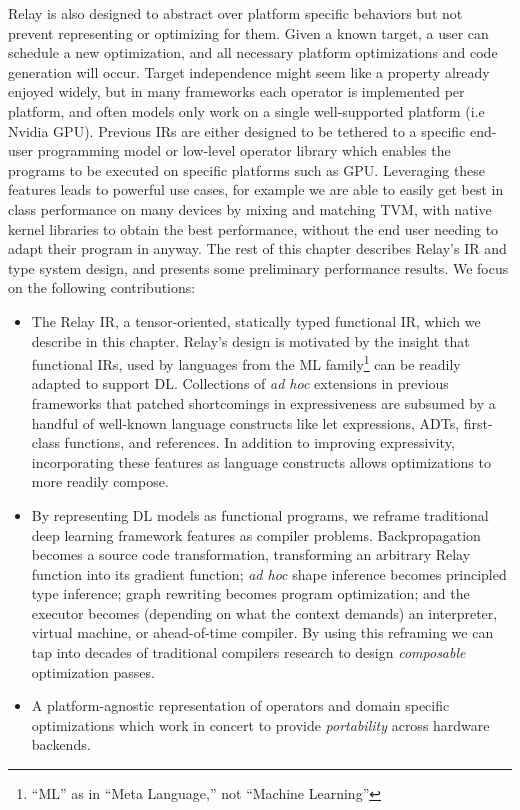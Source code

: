 Relay is also designed to abstract over platform specific behaviors but not prevent
  representing or optimizing for them.
Given a known target, a user can schedule a new optimization,
  and all necessary platform optimizations and code generation will occur.
Target independence might seem like a property already enjoyed widely,
  but in many frameworks each operator is implemented per platform,
  and often models only work on a single well-supported platform (i.e Nvidia GPU).
Previous IRs are either designed to be tethered to a specific end-user programming model
    or low-level operator library which enables the programs to be executed on specific platforms such as GPU.
Leveraging these features leads to powerful use cases,
  for example we are able to easily get best in class performance on many devices by mixing and matching TVM,
  with native kernel libraries to obtain the best performance, without the end user needing to adapt their program
  in anyway.
The rest of this chapter describes Relay’s IR and type system design, and presents some preliminary
  performance results.
We focus on the following contributions:
\begin{itemize}
  \item The Relay IR, a tensor-oriented, statically typed
    functional IR,
    which we describe in this chapter.
  Relay's design is motivated by the insight that functional IRs, used by
  languages from the ML family\footnote{``ML'' as in ``Meta Language,'' not
  ``Machine Learning''} can be readily adapted to support DL.
  Collections of \textit{ad hoc} extensions in previous frameworks
    that patched shortcomings in expressiveness are subsumed by a handful of well-known language
    constructs like let expressions, ADTs, first-class functions, and references.
  In addition to improving expressivity,
    incorporating these features as language constructs
    allows optimizations to more readily compose.
  \item
  By representing DL models as functional programs, we reframe traditional
    deep learning framework features as compiler problems.
  Backpropagation becomes a source code transformation,
    transforming an arbitrary Relay function into its gradient function;
    \textit{ad hoc} shape inference becomes principled type inference;
    graph rewriting becomes program optimization;
    and the executor becomes (depending on what the context demands) an
    interpreter, virtual machine, or ahead-of-time compiler.
  By using this reframing we can tap into
    decades of traditional compilers research to design
    \textit{composable} optimization passes.
  \item
    A platform-agnostic representation of operators and domain specific
      optimizations which work in concert to provide \textit{portability}
      across hardware backends.
\end{itemize}

